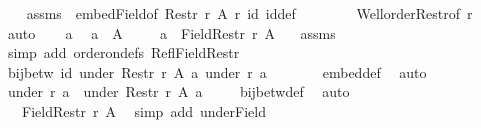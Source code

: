 \begin{isabellebody}
\ \ \isamarkupfalse%
\ assms\ \ embed{\isacharunderscore}{\kern0pt}Field{\isacharbrackleft}{\kern0pt}of\ {\isachardoublequoteopen}Restr\ r\ A{\isachardoublequoteclose}\ r\ id{\isacharbrackright}{\kern0pt}\ id{\isacharunderscore}{\kern0pt}def\isanewline
\ \ \ \ \ \ \ \ Well{\isacharunderscore}{\kern0pt}order{\isacharunderscore}{\kern0pt}Restr{\isacharbrackleft}{\kern0pt}of\ r{\isacharbrackright}{\kern0pt}\ \isamarkupfalse%
\ auto\isanewline
\ \ \isacommand{{\isacharbraceleft}{\kern0pt}}\isamarkupfalse%
\isamarkupfalse%
\ a\ \isamarkupfalse%
\ {\isachardoublequoteopen}a\ {\isasymin}\ A{\isachardoublequoteclose}\isanewline
\ \ \ \isamarkupfalse%
\ {\isachardoublequoteopen}a\ {\isasymin}\ Field{\isacharparenleft}{\kern0pt}Restr\ r\ A{\isacharparenright}{\kern0pt}{\isachardoublequoteclose}\ \isamarkupfalse%
\ {\isacharasterisk}{\kern0pt}\ assms\isanewline
\ \ \ \isamarkupfalse%
\ {\isacharparenleft}{\kern0pt}simp\ add{\isacharcolon}{\kern0pt}\ order{\isacharunderscore}{\kern0pt}on{\isacharunderscore}{\kern0pt}defs\ Refl{\isacharunderscore}{\kern0pt}Field{\isacharunderscore}{\kern0pt}Restr{}{\isacharparenright}{\kern0pt}\isanewline
\ \ \ \isamarkupfalse%
\ {\isachardoublequoteopen}bij{\isacharunderscore}{\kern0pt}betw\ id\ {\isacharparenleft}{\kern0pt}under\ {\isacharparenleft}{\kern0pt}Restr\ r\ A{\isacharparenright}{\kern0pt}\ a{\isacharparenright}{\kern0pt}\ {\isacharparenleft}{\kern0pt}under\ r\ a{\isacharparenright}{\kern0pt}{\isachardoublequoteclose}\isanewline
\ \ \ \isamarkupfalse%
\ {\isacharasterisk}{\kern0pt}\ \isamarkupfalse%
\ embed{\isacharunderscore}{\kern0pt}def\ \isamarkupfalse%
\ auto\isanewline
\ \ \ \isamarkupfalse%
\ {\isachardoublequoteopen}under\ r\ a\ {\isasymle}\ under\ {\isacharparenleft}{\kern0pt}Restr\ r\ A{\isacharparenright}{\kern0pt}\ a{\isachardoublequoteclose}\isanewline
\ \ \ \isamarkupfalse%
\ bij{\isacharunderscore}{\kern0pt}betw{\isacharunderscore}{\kern0pt}def\ \isamarkupfalse%
\ auto\isanewline
\ \ \ \isamarkupfalse%
\ \isamarkupfalse%
\ {\isachardoublequoteopen}{\isasymdots}\ {\isasymle}\ Field{\isacharparenleft}{\kern0pt}Restr\ r\ A{\isacharparenright}{\kern0pt}{\isachardoublequoteclose}\ \isamarkupfalse%
\ {\isacharparenleft}{\kern0pt}simp\ add{\isacharcolon}{\kern0pt}\ under{\isacharunderscore}{\kern0pt}Field{\isacharparenright}{\kern0pt}\isanewline

\end{isabellebody}
